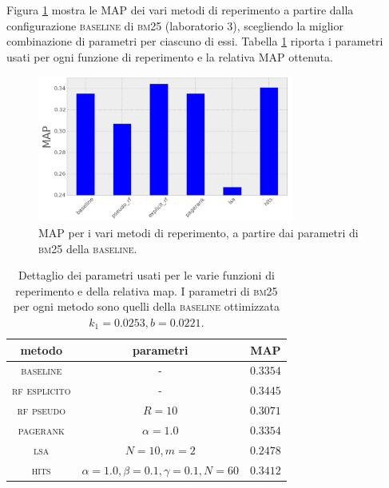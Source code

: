 Figura \ref{fig:map_hist} mostra le MAP dei vari metodi di reperimento a partire dalla configurazione \textsc{baseline} di \textsc{bm25} (laboratorio 3), scegliendo la miglior combinazione di parametri per ciascuno di essi. Tabella \ref{tab:map} riporta i parametri usati per ogni funzione di reperimento e la relativa MAP ottenuta.
\begin{figure}[h]
	\begin{center}
		\includegraphics[width=0.75\textwidth]{figures/hist_map.png}
		\caption{MAP per i vari metodi di reperimento, a partire dai parametri di \textsc{bm25} della \textsc{baseline}.}
		\label{fig:map_hist}
	\end{center}
\end{figure}
\begin{table}[htpb]
	\begin{center}
		\begin{tabular}{|c|c|c|}
			\hline
			metodo & parametri & MAP \\
			\hline
			\textsc{baseline} & - & $0.3354$ \\
			\textsc{rf esplicito} & - & $0.3445$ \\
			\textsc{rf pseudo} & $R=10$ & $0.3071$ \\
			\textsc{pagerank} & $\alpha=1.0$ & $0.3354$ \\
			\textsc{lsa} & $N=10, m=2$ & $0.2478$ \\
			\textsc{hits} & $\alpha=1.0, \beta=0.1, \gamma=0.1, N=60$ & $0.3412$ \\
			\hline
		\end{tabular}
	\end{center}
	\caption{Dettaglio dei parametri usati per le varie funzioni di reperimento e della relativa map. I parametri di \textsc{bm25} per ogni metodo sono quelli della \textsc{baseline} ottimizzata $k_1 = 0.0253, b = 0.0221$.}
	\label{tab:map}
\end{table}

